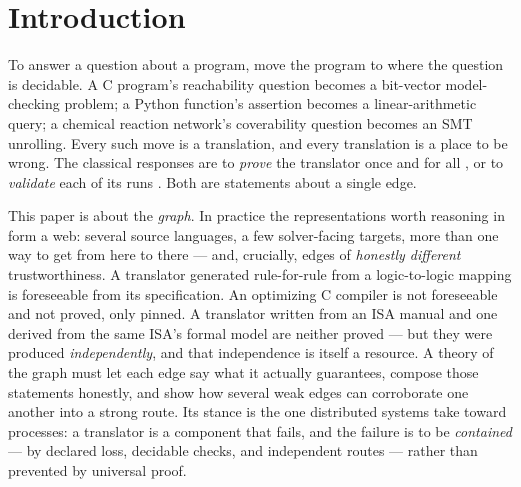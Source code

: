 \section{Introduction}
\label{sec:intro}

To answer a question about a program, move the program to where the
question is decidable. A C program's reachability question becomes a
bit-vector model-checking problem; a Python function's assertion becomes
a linear-arithmetic query; a chemical reaction network's coverability
question becomes an SMT unrolling. Every such move is a translation, and
every translation is a place to be wrong. The classical responses are to
\emph{prove} the translator once and for all
\citep{leroy2009compcert,kumar2014cakeml}, or to \emph{validate} each of
its runs \citep{pnueli1998tv,necula2000tv,lopes2021alive2}. Both are
statements about a single edge.\ifarxiv\repofootnote\fi

This paper is about the \emph{graph}. In practice the representations
worth reasoning in form a web: several source languages, a few
solver-facing targets, more than one way to get from here to there ---
and, crucially, edges of \emph{honestly different} trustworthiness. A
translator generated rule-for-rule from a logic-to-logic mapping is
foreseeable from its specification. An optimizing C compiler is not
foreseeable and not proved, only pinned. A translator written from an ISA
manual and one derived from the same ISA's formal model are neither
proved --- but they were produced \emph{independently}, and that
independence is itself a resource. A theory of the graph must let each
edge say what it actually guarantees, compose those statements honestly,
and show how several weak edges can corroborate one another into a strong
route. Its stance is the one distributed systems take toward processes:
a translator is a component that fails, and the failure is to be
\emph{contained} --- by declared loss, decidable checks, and independent
routes --- rather than prevented by universal proof.

